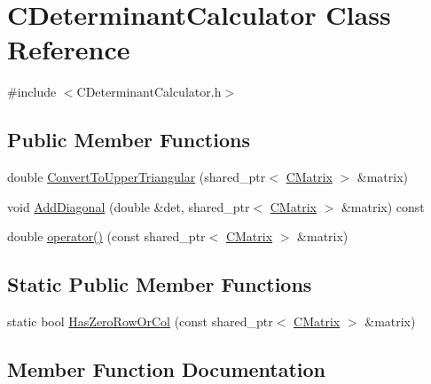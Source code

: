 \hypertarget{classCDeterminantCalculator}{}\section{C\+Determinant\+Calculator Class Reference}
\label{classCDeterminantCalculator}


{\ttfamily \#include $<$C\+Determinant\+Calculator.\+h$>$}

\subsection*{Public Member Functions}
\begin{DoxyCompactItemize}
\item 
double \hyperlink{classCDeterminantCalculator_a118a6d889ca2e24f2e77d2441e788181}{Convert\+To\+Upper\+Triangular} (shared\+\_\+ptr$<$ \hyperlink{classCMatrix}{C\+Matrix} $>$ \&matrix)
\item 
void \hyperlink{classCDeterminantCalculator_a9da30150339c152a64e7e43b10d98d08}{Add\+Diagonal} (double \&det, shared\+\_\+ptr$<$ \hyperlink{classCMatrix}{C\+Matrix} $>$ \&matrix) const 
\item 
double \hyperlink{classCDeterminantCalculator_a1f86ba4955b9cabf3042b96be7563a10}{operator()} (const shared\+\_\+ptr$<$ \hyperlink{classCMatrix}{C\+Matrix} $>$ \&matrix)
\end{DoxyCompactItemize}
\subsection*{Static Public Member Functions}
\begin{DoxyCompactItemize}
\item 
static bool \hyperlink{classCDeterminantCalculator_a3cda3c851df4a12fa39cef7b5fe08261}{Has\+Zero\+Row\+Or\+Col} (const shared\+\_\+ptr$<$ \hyperlink{classCMatrix}{C\+Matrix} $>$ \&matrix)
\end{DoxyCompactItemize}


\subsection{Member Function Documentation}
